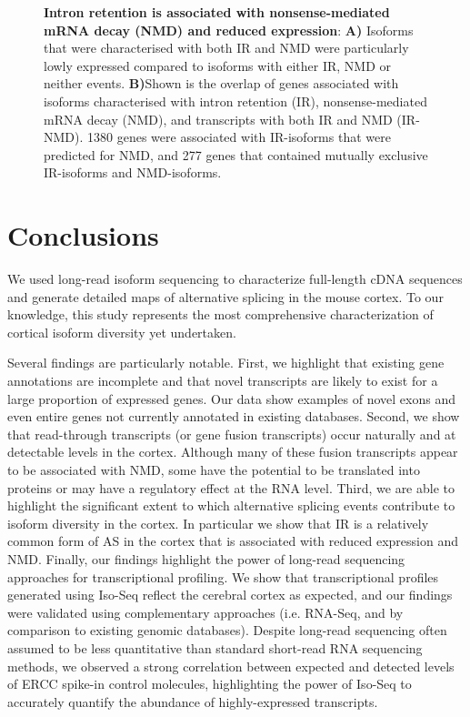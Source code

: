 \begin{figure}[!h]
\begin{center}
	\end{center}
	\captionsetup{width=0.95\textwidth}
	\caption[Association of intron retention and NMD in Whole Transcriptome Iso-Seq]%
	{\textbf{Intron retention is associated with nonsense-mediated mRNA decay (NMD) and reduced expression}: \textbf{A)} Isoforms that were characterised with both IR and NMD were particularly lowly expressed compared to isoforms with either IR, NMD or neither events. \textbf{B)}Shown is the overlap of genes associated with isoforms characterised with intron retention (IR), nonsense-mediated mRNA decay (NMD), and transcripts with both IR and NMD (IR-NMD). 1380 genes were associated with IR-isoforms that were predicted for NMD, and 277 genes that contained mutually exclusive IR-isoforms and NMD-isoforms. }
	\label{fig:isoseq_whole_IRNMD}
\end{figure}


\newpage
\section{Conclusions}
We used long-read isoform sequencing to characterize full-length cDNA sequences and generate detailed maps of alternative splicing in the mouse cortex. To our knowledge, this study represents the most comprehensive characterization of cortical isoform diversity yet undertaken. 

Several findings are particularly notable. First, we highlight that existing gene annotations are incomplete and that novel transcripts are likely to exist for a large proportion of expressed genes. Our data show examples of novel exons and even entire genes not currently annotated in existing databases. Second, we show that read-through transcripts (or gene fusion transcripts) occur naturally\cite{Mehani2020} and at detectable levels in the cortex. Although many of these fusion transcripts appear to be associated with NMD, some have the potential to be translated into proteins or may have a regulatory effect at the RNA level. Third, we are able to highlight the significant extent to which alternative splicing events contribute to isoform diversity in the cortex. In particular we show that IR is a relatively common form of AS in the cortex that is associated with reduced expression and NMD. Finally, our findings highlight the power of long-read sequencing approaches for transcriptional profiling. We show that transcriptional profiles generated using Iso-Seq reflect the cerebral cortex as expected, and our findings were validated using complementary approaches (i.e. RNA-Seq, and by comparison to existing genomic databases). Despite long-read sequencing often assumed to be less quantitative than standard short-read RNA sequencing methods\cite{Zhao2019}, we observed a strong correlation between expected and detected levels of ERCC spike-in control molecules, highlighting the power of Iso-Seq to accurately quantify the abundance of highly-expressed transcripts.


